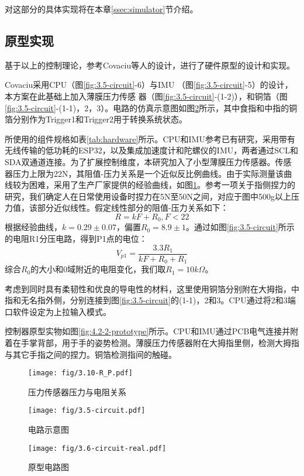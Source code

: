 对这部分的具体实现将在本章\ref{ssec:simulator}节介绍。

\subsection{原型实现}\label{ssec:prt}

基于以上的控制理论，参考Covaciu\cites{covaciu2022control}等人的设计，进行了硬件原型的设计和实现。

Covaciu\cites{covaciu2022control}采用CPU（图\ref{fig:3.5-circuit}-6）与IMU （图\ref{fig:3.5-circuit}-5）的设计，本方案在此基础上加入薄膜压力传感
器（图\ref{fig:3.5-circuit}-(1-2)），和铜箔（图\ref{fig:3.5-circuit}-(1-1)，2，3）。电路的仿真示意图如图\ref{fig:4.2-1-circuit}所示，其中食指和中指的铜箔分别作为Trigger1和Trigger2用于转换系统状态。

所使用的组件规格如表\ref{tab:hardware}所示。CPU和IMU参考已有研究\cites{covaciu2022control}，采用带有无线传输的低功耗的ESP32，以及集成加速度计和陀螺仪的IMU，两者通过SCL和SDA双通道连接。为了扩展控制维度，本研究加入了小型薄膜压力传感器。传感器压力上限为22N，其阻值-压力关系是一个近似反比例曲线。由于实际测量该曲线较为困难，采用了生产厂家提供的经验曲线，如图\ref{fig:3.10-R_P}。参考一项关于指侧捏力的研究\cites{呼慧敏2022中国成年人指侧捏力测量研究}，我们确定人在日常使用设备时捏力在5N至50N之间，对应于图中500g以上压力值，该部分近似线性。假定线性部分的阻值-压力关系如下：
$$
R = kF+R_0, F<22
$$
根据经验曲线，$k=0.29\pm 0.07$，偏置$R_0=8.9\pm1$。通过如图\ref{fig:3.5-circuit}所示的电阻R1分压电路，得到P1点的电位：
$$
V_{p1} = \frac{3.3R_1}{kF+R_0+R_1}
$$
综合$R_0$的大小和0域附近的电阻变化，我们取$R_1=10k\Omega$。

考虑到同时具有柔韧性和优良的导电性的材料，这里使用铜箔分别附在大拇指，中指和无名指外侧，分别连接到图\ref{fig:3.5-circuit}的(1-1)，2和3。CPU通过将2和3端口软件设定为上拉输入模式。

控制器原型实物如图\ref{fig:4.2-2-prototype}所示。CPU和IMU通过PCB电气连接并附着在手掌背部，用于手的姿势检测。薄膜压力传感器附在大拇指里侧，检测大拇指与其它手指之间的捏力。铜箔检测指间的触碰。

\begin{figure}[htbp]
    \centering
    \texttt{[image: fig/3.10-R\_P.pdf]}
    \caption{压力传感器压力与电阻关系}
    \label{fig:3.10-R_P}
\end{figure}

\begin{figure}[htbp]
    \centering
    \texttt{[image: fig/3.5-circuit.pdf]}
    \caption{电路示意图}
    \label{fig:3.5-circuit}

    \vspace{-10pt}
    \texttt{[image:  fig/3.6-circuit-real.pdf]}
    \caption{原型电路图}
    \label{fig:4.2-1-circuit}
    \vspace{-20pt}
\end{figure}


